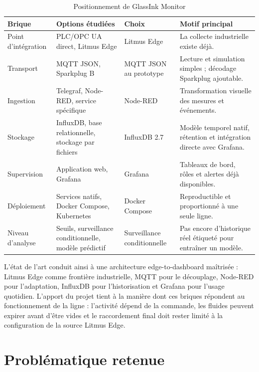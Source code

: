 \begin{table}[H]
\centering
\small
\caption{Positionnement de GlassInk Monitor}
\begin{tabularx}{\textwidth}{
  >{\raggedright\arraybackslash}p{}
  >{\raggedright\arraybackslash}p{}
  >{\raggedright\arraybackslash}p{}
  Y}
\toprule
Brique & Options étudiées & Choix & Motif principal \\
\midrule
Point d'intégration &
PLC/OPC UA direct, Litmus Edge &
Litmus Edge &
La collecte industrielle existe déjà. \\
Transport &
MQTT JSON, Sparkplug B &
MQTT JSON au prototype &
Lecture et simulation simples ; décodage Sparkplug ajoutable. \\
Ingestion &
Telegraf, Node-RED, service spécifique &
Node-RED &
Transformation visuelle des mesures et événements. \\
Stockage &
InfluxDB, base relationnelle, stockage par fichiers &
InfluxDB 2.7 &
Modèle temporel natif, rétention et intégration directe avec Grafana. \\
Supervision &
Application web, Grafana &
Grafana &
Tableaux de bord, rôles et alertes déjà disponibles. \\
Déploiement &
Services natifs, Docker Compose, Kubernetes &
Docker Compose &
Reproductible et proportionné à une seule ligne. \\
Niveau d'analyse &
Seuils, surveillance conditionnelle, modèle prédictif &
Surveillance conditionnelle &
Pas encore d'historique réel étiqueté pour entraîner un modèle. \\
\bottomrule
\end{tabularx}
\end{table}

L'état de l'art conduit ainsi à une architecture edge-to-dashboard maîtrisée :
Litmus Edge comme frontière industrielle, MQTT pour le découplage, Node-RED
pour l'adaptation, InfluxDB pour l'historisation et Grafana pour l'usage
quotidien. L'apport du projet tient à la manière dont ces briques répondent au
fonctionnement de la ligne : l'activité dépend de la commande, les fluides
peuvent expirer avant d'être vides et le raccordement final doit rester limité
à la configuration de la source Litmus Edge.

\clearpage
\section{Problématique retenue}

